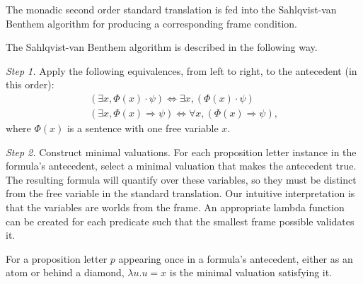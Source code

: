 %

The monadic second order standard translation is fed into the Sahlqvist-van Benthem algorithm for producing a corresponding frame condition.

The Sahlqvist-van Benthem algorithm is described in the following way.

\emph{Step 1.} Apply the following equivalences, from left to right, to the antecedent (in this order):
\begin{eqnarray}
(\exists x, \varPhi(x) \cdot\psi )\Longleftrightarrow \exists x, (\varPhi(x) \cdot\psi)\\
(\exists x, \varPhi(x) \Longrightarrow \psi) \Longleftrightarrow \forall x, (\varPhi(x) \Longrightarrow \psi),
\end{eqnarray}
where $\varPhi(x)$ is a sentence with one free variable $x$.

\emph{Step 2.} Construct minimal valuations. For each proposition letter instance in the formula's antecedent, select a minimal valuation that makes the antecedent true. The resulting formula will quantify over these variables, so they must be distinct from the free variable in the standard translation. Our intuitive interpretation is that the variables are worlds from the frame. An appropriate lambda function can be created for each predicate such that the smallest frame possible validates it.

For a proposition letter $p$ appearing once in a formula's antecedent, either as an atom or behind a diamond, $\lambda u.u=x$ is the minimal valuation satisfying it.

